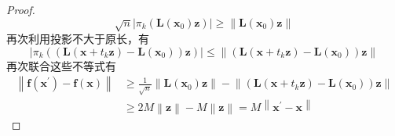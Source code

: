 \documentclass[main.tex]{subfiles}
\begin{document}
\begin{proof}
\[
\sqrt{n}\left|\pi_k\left(\mathbf{L}\left(\mathbf{x}_0\right)\mathbf{z}\right)\right|\geq\left\|\mathbf{L}\left(\mathbf{x}_0\right)\mathbf{z}\right\|
\]
再次利用投影不大于原长，有
\[
\left|\pi_k\left(\left(\mathbf{L}\left(\mathbf{x}+t_k\mathbf{z}\right)-\mathbf{L}\left(\mathbf{x}_0\right)\right)\mathbf{z}\right)\right|\leq\left\|\left(\mathbf{L}\left(\mathbf{x}+t_k\mathbf{z}\right)-\mathbf{L}\left(\mathbf{x}_0\right)\right)\mathbf{z}\right\|\]
再次联合这些不等式有
\begin{align*}
\left\|\mathbf{f}\left(\mathbf{x}^\prime\right)-\mathbf{f}\left(\mathbf{x}\right)\right\|&\geq\frac{1}{\sqrt{n}}\left\|\mathbf{L}\left(\mathbf{x}_0\right)\mathbf{z}\right\|-\left\|\left(\mathbf{L}\left(\mathbf{x}+t_k\mathbf{z}\right)-\mathbf{L}\left(\mathbf{x}_0\right)\right)\mathbf{z}\right\|\\
&\geq2M\left\|\mathbf{z}\right\|-M\left\|\mathbf{z}\right\|=M\left\|\mathbf{x}^\prime-\mathbf{x}\right\|
\end{align*}
\end{proof}
\end{document}
